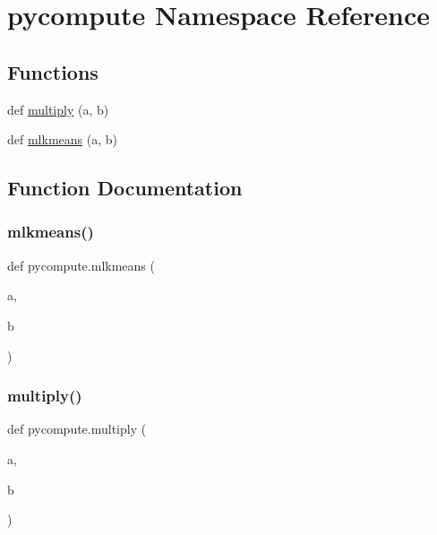 \hypertarget{namespacepycompute}{}\section{pycompute Namespace Reference}
\label{namespacepycompute}
\subsection*{Functions}
\begin{DoxyCompactItemize}
\item 
def \mbox{\hyperlink{namespacepycompute_aacab1cd7d71c4a56f4d70e7da76b28fe}{multiply}} (a, b)
\item 
def \mbox{\hyperlink{namespacepycompute_a9e38483f46fe7cb78b9168755e4a410d}{mlkmeans}} (a, b)
\end{DoxyCompactItemize}


\subsection{Function Documentation}
\mbox{\label{namespacepycompute_a9e38483f46fe7cb78b9168755e4a410d}} 
\subsubsection{\texorpdfstring{mlkmeans()}{mlkmeans()}}
{\footnotesize\ttfamily def pycompute.\+mlkmeans (\begin{DoxyParamCaption}\item[{}]{a,  }\item[{}]{b }\end{DoxyParamCaption})}

\mbox{\label{namespacepycompute_aacab1cd7d71c4a56f4d70e7da76b28fe}} 
\subsubsection{\texorpdfstring{multiply()}{multiply()}}
{\footnotesize\ttfamily def pycompute.\+multiply (\begin{DoxyParamCaption}\item[{}]{a,  }\item[{}]{b }\end{DoxyParamCaption})}

